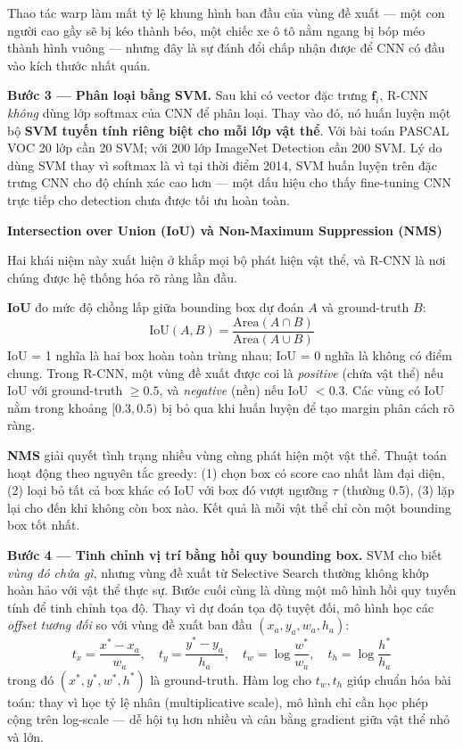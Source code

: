 Thao tác warp làm mất tỷ lệ khung hình ban đầu của vùng đề xuất --- một con người cao gầy sẽ bị kéo thành béo, một chiếc xe ô tô nằm ngang bị bóp méo thành hình vuông --- nhưng đây là sự đánh đổi chấp nhận được để CNN có đầu vào kích thước nhất quán.

\textbf{Bước 3 — Phân loại bằng SVM.}
Sau khi có vector đặc trưng $\mathbf{f}_i$, R-CNN \textit{không} dùng lớp softmax của CNN để phân loại. Thay vào đó, nó huấn luyện một bộ \textbf{SVM tuyến tính riêng biệt cho mỗi lớp vật thể}. Với bài toán PASCAL VOC 20 lớp cần 20 SVM; với 200 lớp ImageNet Detection cần 200 SVM. Lý do dùng SVM thay vì softmax là vì tại thời điểm 2014, SVM huấn luyện trên đặc trưng CNN cho độ chính xác cao hơn --- một dấu hiệu cho thấy fine-tuning CNN trực tiếp cho detection chưa được tối ưu hoàn toàn.

\begin{mdframed}[style=infobox]
\textbf{Intersection over Union (IoU) và Non-Maximum Suppression (NMS)}

Hai khái niệm này xuất hiện ở khắp mọi bộ phát hiện vật thể, và R-CNN là nơi chúng được hệ thống hóa rõ ràng lần đầu.

\textbf{IoU} đo mức độ chồng lấp giữa bounding box dự đoán $A$ và ground-truth $B$:
\[
\text{IoU}(A, B) = \frac{\text{Area}(A \cap B)}{\text{Area}(A \cup B)}
\]
IoU = 1 nghĩa là hai box hoàn toàn trùng nhau; IoU = 0 nghĩa là không có điểm chung. Trong R-CNN, một vùng đề xuất được coi là \textit{positive} (chứa vật thể) nếu IoU với ground-truth $\geq 0.5$, và \textit{negative} (nền) nếu IoU $< 0.3$. Các vùng có IoU nằm trong khoảng $[0.3, 0.5)$ bị bỏ qua khi huấn luyện để tạo margin phân cách rõ ràng.

\textbf{NMS} giải quyết tình trạng nhiều vùng cùng phát hiện một vật thể. Thuật toán hoạt động theo nguyên tắc greedy: (1) chọn box có score cao nhất làm đại diện, (2) loại bỏ tất cả box khác có IoU với box đó vượt ngưỡng $\tau$ (thường 0.5), (3) lặp lại cho đến khi không còn box nào. Kết quả là mỗi vật thể chỉ còn một bounding box tốt nhất.
\end{mdframed}

\textbf{Bước 4 — Tinh chỉnh vị trí bằng hồi quy bounding box.}
SVM cho biết \textit{vùng đó chứa gì}, nhưng vùng đề xuất từ Selective Search thường không khớp hoàn hảo với vật thể thực sự. Bước cuối cùng là dùng một mô hình hồi quy tuyến tính để tinh chỉnh tọa độ. Thay vì dự đoán tọa độ tuyệt đối, mô hình học các \textit{offset tương đối} so với vùng đề xuất ban đầu $(x_a, y_a, w_a, h_a)$:
\[
t_x = \frac{x^* - x_a}{w_a}, \quad t_y = \frac{y^* - y_a}{h_a}, \quad t_w = \log \frac{w^*}{w_a}, \quad t_h = \log \frac{h^*}{h_a}
\]
trong đó $(x^*, y^*, w^*, h^*)$ là ground-truth. Hàm log cho $t_w, t_h$ giúp chuẩn hóa bài toán: thay vì học tỷ lệ nhân (multiplicative scale), mô hình chỉ cần học phép cộng trên log-scale --- dễ hội tụ hơn nhiều và cân bằng gradient giữa vật thể nhỏ và lớn.

